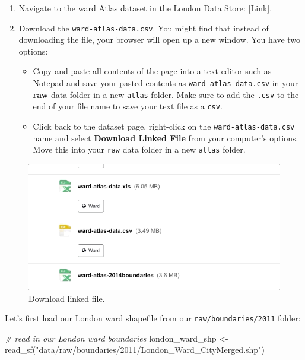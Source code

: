 \documentclass[
]{book}
\newenvironment{Shaded}{\begin{snugshade}}{\end{snugshade}}
\newcommand{\CommentTok}[1]{\textcolor[rgb]{0.56,0.35,0.01}{\textit{#1}}}
\newcommand{\FunctionTok}[1]{\textcolor[rgb]{0.00,0.00,0.00}{#1}}
\newcommand{\NormalTok}[1]{#1}
\newcommand{\OtherTok}[1]{\textcolor[rgb]{0.56,0.35,0.01}{#1}}
\newcommand{\StringTok}[1]{\textcolor[rgb]{0.31,0.60,0.02}{#1}}
\providecommand{\tightlist}{%
  \setlength{\itemsep}{0pt}\setlength{\parskip}{0pt}}
\begin{document}
\begin{enumerate}
\def\labelenumi{\arabic{enumi}.}
\tightlist
\item
  Navigate to the ward Atlas dataset in the London Data Store: \href{https://data.london.gov.uk/dataset/ward-profiles-and-atlas}{{[}Link{]}}.
\item
  Download the \texttt{ward-atlas-data.csv}. You might find that instead of downloading the file, your browser will open up a new window. You have two options:

  \begin{itemize}
  \tightlist
  \item
    Copy and paste all contents of the page into a text editor such as Notepad and save your pasted contents as \texttt{ward-atlas-data.csv} in your \textbf{raw} data folder in a new \texttt{atlas} folder. Make sure to add the \texttt{.csv} to the end of your file name to save your text file as a \texttt{csv}.
  \item
    Click back to the dataset page, right-click on the \texttt{ward-atlas-data.csv} name and select \textbf{Download Linked File} from your computer's options. Move this into your \texttt{raw} data folder in a new \texttt{atlas} folder.
  \end{itemize}
\end{enumerate}

\begin{figure}

{\centering \includegraphics[width=450pt]{images/w07/download_shot} 

}

\caption{Download linked file.}\label{fig:07-download-gif}
\end{figure}

Let's first load our London ward shapefile from our \texttt{raw/boundaries/2011} folder:

\begin{Shaded}
\begin{Highlighting}[]
\CommentTok{\# read in our London ward boundaries}
\NormalTok{london\_ward\_shp }\OtherTok{\textless{}{-}} \FunctionTok{read\_sf}\NormalTok{(}\StringTok{"data/raw/boundaries/2011/London\_Ward\_CityMerged.shp"}\NormalTok{)}
\end{Highlighting}
\end{Shaded}
\end{document}
